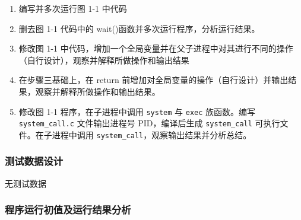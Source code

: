\documentclass{article}
\begin{document}
    \begin{enumerate}
        \item 编写并多次运行图 1-1 中代码
        \item 删去图 1-1 代码中的 wait()函数并多次运行程序，分析运行结果。
        \item 修改图 1-1 中代码，增加一个全局变量并在父子进程中对其进行不同的操作（自行设计），观察并解释所做操作和输出结果
        \item 在步骤三基础上，在 return 前增加对全局变量的操作（自行设计）并输出结果，观察并解释所做操作和输出结果。
        \item 修改图 1-1 程序，在子进程中调用 \texttt{system} 与 \texttt{exec} 族函数。编写 \texttt{system\_call.c} 文件输出进程号 PID，编译后生成 \texttt{system\_call} 可执行文件。在子进程中调用 \texttt{system\_call}，观察输出结果并分析总结。
    \end{enumerate}

    \subsubsection{测试数据设计}

    无测试数据

    \subsubsection{程序运行初值及运行结果分析}
\end{document}
